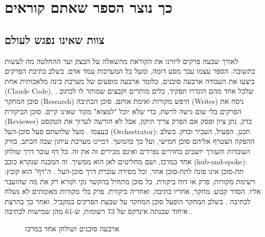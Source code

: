 \chapter{כך נוצר הספר שאתם קוראים}\label{ch:appendix}
\section{צוות שאינו נפגש לעולם}
לאורך שבעה פרקים ליווינו את הקוראת מהשאלה על הבצק ועד ההחלטה מה לעשות בתשובה. הספר עצמו עבר מסע דומה, ומעל כל המערכות עמד אדם.
בשלב כתיבת הפרקים ביצעו את העבודה ארבעה סוכנים, כלומר ארבעה מופעים של מערכת בינה מלאכותית אחת (Claude Code), שלכל אחד מהם הוגדרו תפקיד, כלים מותרים וקבצים שמותר לו לכתוב . סוכן המחקר (Research) חיפש מקורות ואימת אותם. סוכן הכתיבה (Writer) ניסח את הפרקים בלי שום גישה לרשת, כדי שלא יוכל "למצוא" מקור שאינו קיים. סוכן הביקורת (Reviewer) בדק, נתן ציון ופסק אם הפרק צריך תיקון, אבל לא הורשה לערוך את הטקסט בעצמו . מעל שלושתם פעל סוכן-העל (Orchestrator): תכנן, הפעיל, העביר ובדק. בשלב ההפקה הצטרף אליהם סוכן חמישי, ועל כך בהמשך.
דמיינו מערכת עיתון שבה הכתב, בודק העובדות והעורך יושבים בחדרים נפרדים ואינם מכירים זה את זה. כל דף עובר דרך שולחן אחד במרכז, ושם מחליטים לאן הוא ממשיך. זה המבנה שנקרא כוכב (hub-and-spoke): תת-סוכן אינו פונה לתת-סוכן אחר, וכל מסירה עוברת דרך סוכן-העל . ה"דף" הוא קובץ: רשימת מקורות, פרק או דוח ביקורת. כל סוכן מתחיל בהקשר נקי וקורא רק את מה שהועבר אליו.
הסדר קבוע: מחקר, אחריו כתיבה, ואחריה ביקורת. פרק בלי מקורות מאומתים לא נשלח לכתיבה . בשלב המחקר הופעל סוכן המחקר על שבעת הפרקים במקביל, ואחר כך בהרצת איחוד שבנתה אינדקס של 73 רשומות, ש-61 מהן שמישות לכתיבה .
\begin{figure}[htbp]
\centering

\caption{ארבעה סוכנים ושולחן אחד במרכז}\label{fig:A.1}
\end{figure}
